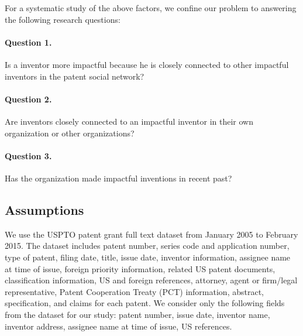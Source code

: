 For a systematic study of the above factors, we confine our problem to
answering the following research questions:

\paragraph{Question 1.} Is a inventor more impactful because he is closely
connected to other impactful inventors in the patent social network? 

\paragraph{Question  2.} Are inventors closely connected to an impactful
inventor in their own organization or other organizations? %

\paragraph{Question  3.} Has the organization made impactful inventions in
recent past? %


\subsection{Assumptions}

We use the USPTO patent grant full text dataset from January 2005 to February
2015.  The dataset includes patent number, series code and application number,
type of patent, filing date, title, issue date, inventor information, assignee
name at time of issue, foreign priority information, related US patent
documents, classification information, US and foreign references, attorney,
agent or firm/legal representative, Patent Cooperation Treaty (PCT)
information, abstract, specification, and claims for each patent. We consider
only the following fields from the dataset for our study: patent number, issue
date, inventor name, inventor address, assignee name at time of issue, US
references.

